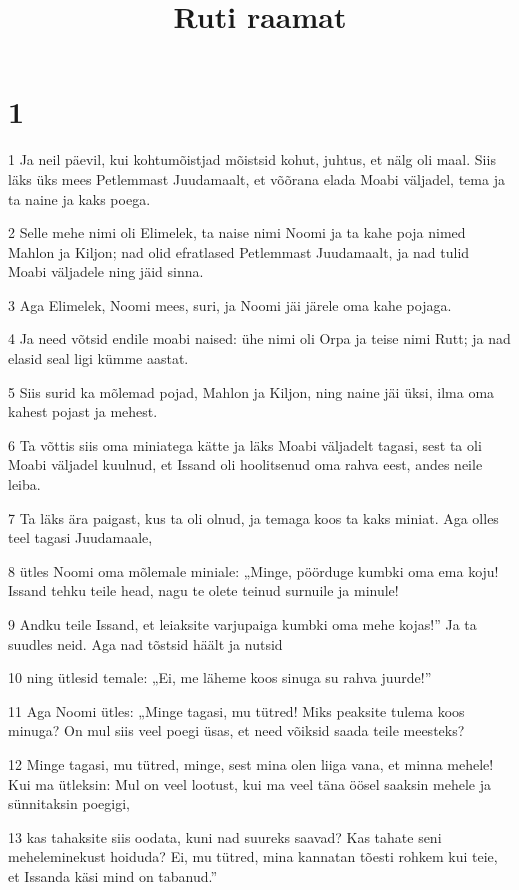 

\title{Ruti raamat}

\chapter{1}

\par 1 Ja neil päevil, kui kohtumõistjad mõistsid kohut, juhtus, et nälg oli maal. Siis läks üks mees Petlemmast Juudamaalt, et võõrana elada Moabi väljadel, tema ja ta naine ja kaks poega.
\par 2 Selle mehe nimi oli Elimelek, ta naise nimi Noomi ja ta kahe poja nimed Mahlon ja Kiljon; nad olid efratlased Petlemmast Juudamaalt, ja nad tulid Moabi väljadele ning jäid sinna.
\par 3 Aga Elimelek, Noomi mees, suri, ja Noomi jäi järele oma kahe pojaga.
\par 4 Ja need võtsid endile moabi naised: ühe nimi oli Orpa ja teise nimi Rutt; ja nad elasid seal ligi kümme aastat.
\par 5 Siis surid ka mõlemad pojad, Mahlon ja Kiljon, ning naine jäi üksi, ilma oma kahest pojast ja mehest.
\par 6 Ta võttis siis oma miniatega kätte ja läks Moabi väljadelt tagasi, sest ta oli Moabi väljadel kuulnud, et Issand oli hoolitsenud oma rahva eest, andes neile leiba.
\par 7 Ta läks ära paigast, kus ta oli olnud, ja temaga koos ta kaks miniat. Aga olles teel tagasi Juudamaale,
\par 8 ütles Noomi oma mõlemale miniale: „Minge, pöörduge kumbki oma ema koju! Issand tehku teile head, nagu te olete teinud surnuile ja minule!
\par 9 Andku teile Issand, et leiaksite varjupaiga kumbki oma mehe kojas!” Ja ta suudles neid. Aga nad tõstsid häält ja nutsid
\par 10 ning ütlesid temale: „Ei, me läheme koos sinuga su rahva juurde!”
\par 11 Aga Noomi ütles: „Minge tagasi, mu tütred! Miks peaksite tulema koos minuga? On mul siis veel poegi üsas, et need võiksid saada teile meesteks?
\par 12 Minge tagasi, mu tütred, minge, sest mina olen liiga vana, et minna mehele! Kui ma ütleksin: Mul on veel lootust, kui ma veel täna öösel saaksin mehele ja sünnitaksin poegigi,
\par 13 kas tahaksite siis oodata, kuni nad suureks saavad? Kas tahate seni meheleminekust hoiduda? Ei, mu tütred, mina kannatan tõesti rohkem kui teie, et Issanda käsi mind on tabanud.”

